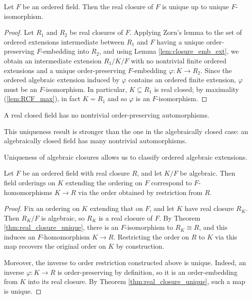 \begin{theorem}
  \label{thm:real_closure_unique}
  Let $F$ be an ordered field. Then the real closure of $F$ is unique up to unique $F$-isomorphism.
\end{theorem}
\begin{proof}
  Let $R_1$ and $R_2$ be real closures of $F$. Applying Zorn's lemma to the set of ordered extensions intermediate between $R_1$ and $F$ having a unique order-preserving $F$-embedding into $R_2$, and using Lemma \ref{lem:closure_emb_ext}, we obtain an intermediate extension $R_1/K/F$ with no nontrivial finite ordered extensions and a unique order-preserving $F$-embedding $\varphi:K\to R_2$. Since the ordered algebraic extension induced by $\varphi$ contains an ordered finite extension, $\varphi$ must be an $F$-isomorphism. In particular, $K\subseteq R_1$ is real closed; by maximality (\ref{lem:RCF_max}), in fact $K=R_1$ and so $\varphi$ is an $F$-isomorphism.
\end{proof}

\begin{corollary}
  A real closed field has no nontrivial order-preserving automorphisms.
\end{corollary}

This uniqueness result is stronger than the one in the algebraically closed case: an algebraically closed field has many nontrivial automorphisms.

Uniqueness of algebraic closures allows us to classify ordered algebraic extensions.

\begin{lemma}
  \label{lem:ord_alg_ext_eq_emb}
  Let $F$ be an ordered field with real closure $R$, and let $K/F$ be algebraic. Then field orderings on $K$ extending the ordering on $F$ correspond to $F$-homomorphisms $K\to R$ via the order obtained by restriction from $R$.
\end{lemma}
\begin{proof}
  Fix an ordering on $K$ extending that on $F$, and let $K$ have real closure $R_K$. Then $R_K/F$ is algebraic, so $R_K$ is a real closure of $F$. By Theorem \ref{thm:real_closure_unique}, there is an $F$-isomorphism to $R_K\cong R$, and this induces an $F$-homomorphism $K\to R$. Restricting the order on $R$ to $K$ via this map recovers the original order on $K$ by construction.
  
  Moreover, the inverse to order restriction constructed above is unique. Indeed, an inverse $\varphi:K\to R$ is order-preserving by definition, so it is an order-embedding from $K$ into its real closure. By Theorem \ref{thm:real_closure_unique}, such a map is unique.
\end{proof}

